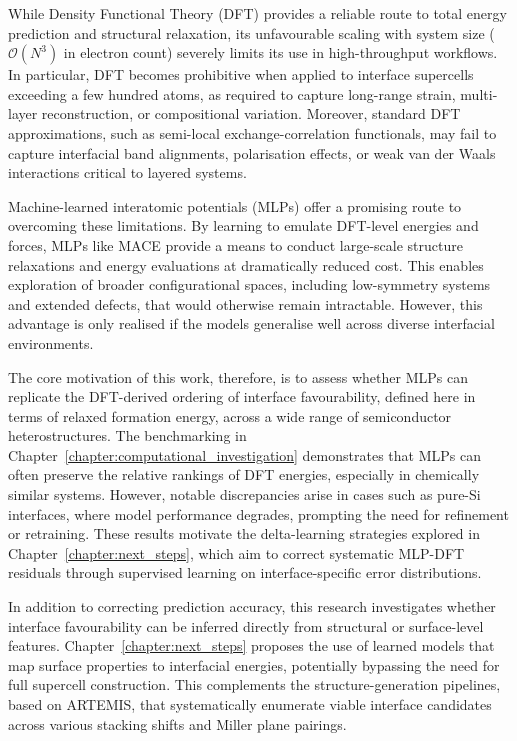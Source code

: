 While Density Functional Theory (DFT) provides a reliable route to total energy prediction and structural relaxation, its unfavourable scaling with system size ($\mathcal{O}(N^3)$ in electron count) severely limits its use in high-throughput workflows. In particular, DFT becomes prohibitive when applied to interface supercells exceeding a few hundred atoms, as required to capture long-range strain, multi-layer reconstruction, or compositional variation. Moreover, standard DFT approximations, such as semi-local exchange-correlation functionals, may fail to capture interfacial band alignments, polarisation effects, or weak van der Waals interactions critical to layered systems. 

Machine-learned interatomic potentials (MLPs) offer a promising route to overcoming these limitations. By learning to emulate DFT-level energies and forces, MLPs like MACE provide a means to conduct large-scale structure relaxations and energy evaluations at dramatically reduced cost. This enables exploration of broader configurational spaces, including low-symmetry systems and extended defects, that would otherwise remain intractable. However, this advantage is only realised if the models generalise well across diverse interfacial environments. 

The core motivation of this work, therefore, is to assess whether MLPs can replicate the DFT-derived ordering of interface favourability, defined here in terms of relaxed formation energy, across a wide range of semiconductor heterostructures. The benchmarking in Chapter~\ref{chapter:computational_investigation} demonstrates that MLPs can often preserve the relative rankings of DFT energies, especially in chemically similar systems. However, notable discrepancies arise in cases such as pure-Si interfaces, where model performance degrades, prompting the need for refinement or retraining. These results motivate the delta-learning strategies explored in Chapter~\ref{chapter:next_steps}, which aim to correct systematic MLP-DFT residuals through supervised learning on interface-specific error distributions. 

In addition to correcting prediction accuracy, this research investigates whether interface favourability can be inferred directly from structural or surface-level features. Chapter~\ref{chapter:next_steps} proposes the use of learned models that map surface properties to interfacial energies, potentially bypassing the need for full supercell construction. This complements the structure-generation pipelines, based on ARTEMIS, that systematically enumerate viable interface candidates across various stacking shifts and Miller plane pairings. 

